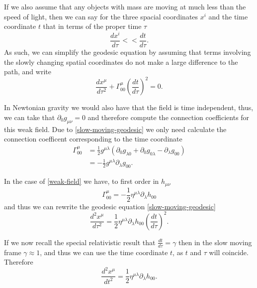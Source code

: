 If we also assume that any objects with mass are moving at much less than the speed of light, then we can say for the three spacial coordinates \(x^i\) and the time coordinate \(t\) that in terms of the proper time \(\tau\) \cite{carroll}
\begin{equation} \label{slow-moving}
	\frac{d x^i}{d \tau} << \frac{d t}{d \tau} .
\end{equation}
As such, we can simplify the geodesic equation by assuming that terms involving the slowly changing spatial coordinates do not make a large difference to the path, and write
\begin{equation} \label{slow-moving-geodesic}
	\frac{d x^{\mu}}{d \tau^2} + \Gamma^{\mu}_{00} \left( \frac{d t}{d \tau} \right)^2 = 0 .
\end{equation}

In Newtonian gravity we would also have that the field is time independent, thus, we can take that \(\partial_{0} g_{\mu \nu} = 0\) and therefore compute the connection coefficients for this weak field. Due to \eqref{slow-moving-geodesic} we only need calculate the connection coefficent corresponding to the time coordinate
\begin{equation} \label{coefficent-weak}
	\begin{aligned}
	\Gamma^{\mu}_{00} &= \frac{1}{2} g^{\mu \lambda} (\partial_0 g_{\lambda 0} + \partial_0 g_{0 \lambda} - \partial_{\lambda} g_{00}) \\
	&= - \frac{1}{2} g^{\mu \lambda} \partial_{\lambda} g_{00} .
	\end{aligned}
\end{equation}

In the case of \eqref{weak-field} we have, to first order in \(h_{\mu \nu}\) \cite{carroll}
\begin{equation} \label{coefficent-weak2}
	\Gamma^{\mu}_{00} = - \frac{1}{2} \eta^{\mu \lambda} \partial_{\lambda} h_{00}
\end{equation}
and thus we can rewrite the geodesic equation \eqref{slow-moving-geodesic}
\begin{equation} \label{geodesic-connections-slow}
	\frac{d^2 x^{\mu}}{d \tau^2} = \frac{1}{2} \eta^{\mu \lambda} \partial_{\lambda} h_{00} \left( \frac{d t}{d \tau} \right)^2 .
\end{equation}

If we now recall the special relativistic result that \(\frac{d t}{d \tau} = \gamma\) then in the slow moving frame \(\gamma \approx 1\), and thus we can use the time coordinate \(t\), as \(t\) and \(\tau\) will coincide. Therefore
\begin{equation} \label{geodesic-connections-slow2}
	\frac{d^2 x^{\mu}}{d t^2} = \frac{1}{2} \eta^{\mu \lambda} \partial_{\lambda} h_{00} .
\end{equation}

